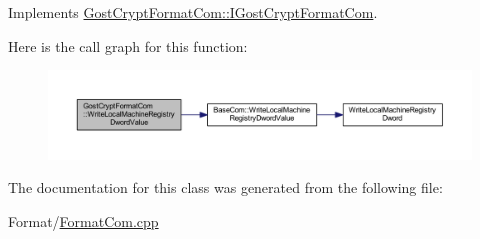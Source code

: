 Implements \hyperlink{interface_gost_crypt_format_com_1_1_i_gost_crypt_format_com}{Gost\+Crypt\+Format\+Com\+::\+I\+Gost\+Crypt\+Format\+Com}.

Here is the call graph for this function\+:
\nopagebreak
\begin{figure}[H]
\begin{center}
\leavevmode
\includegraphics[width=350pt]{class_gost_crypt_format_com_a7caf1429158f4ab9531848ab5bc16762_cgraph}
\end{center}
\end{figure}


The documentation for this class was generated from the following file\+:\begin{DoxyCompactItemize}
\item 
Format/\hyperlink{_format_com_8cpp}{Format\+Com.\+cpp}\end{DoxyCompactItemize}

